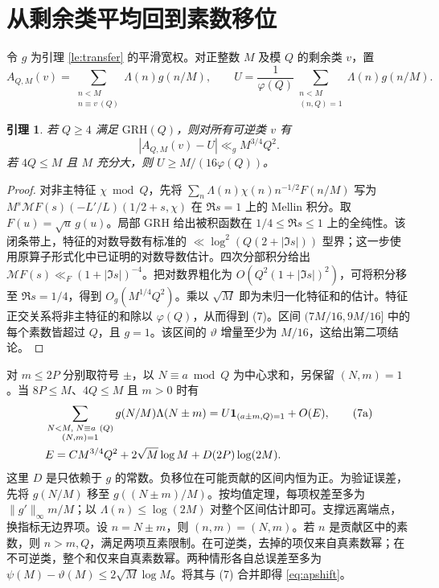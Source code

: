 \documentclass[UTF8,a4paper,11pt,fontset=fandol]{ctexart}
\newtheorem{lemma}[theorem]{引理}
\newcommand{\Lam}{\Lambda}
\newcommand{\ind}{\mathbf 1}
\newcommand{\GRH}{\mathrm{GRH}}
\begin{document}
\section{从剩余类平均回到素数移位}
令 \(g\) 为引理 \ref{le:transfer} 的平滑宽权。对正整数 \(M\) 及模 \(Q\) 的剩余类 \(v\)，置
\[
 A_{Q,M}(v)=\sum_{\substack{n<M\\n\equiv v\ (Q)}}\Lam(n)g(n/M),
 \qquad U=\frac{1}{\varphi(Q)}
       \sum_{\substack{n<M\\(n,Q)=1}}\Lam(n)g(n/M).
\]
\begin{lemma}\label{le:ap}
若 \(Q\ge4\) 满足 \(\GRH(Q)\)，则对所有可逆类 \(v\) 有
\[
                  |A_{Q,M}(v)-U|\ll_g M^{3/4}Q^2.            \tag{7}
\]
若 \(4Q\le M\) 且 \(M\) 充分大，则 \(U\ge M/(16\varphi(Q))\)。
\end{lemma}
\begin{proof}
对非主特征 \(\chi\bmod Q\)，先将
\(\sum_n\Lam(n)\chi(n)n^{-1/2}F(n/M)\) 写为
\(M^s\mathcal MF(s)(-L'/L)(1/2+s,\chi)\) 在 \(\Re s=1\) 上的 Mellin 积分。取 \(F(u)=\sqrt{u}\,g(u)\)。局部 GRH 给出被积函数在 \(1/4\le\Re s\le1\) 上的全纯性。该闭条带上，特征的对数导数有标准的 \(\ll\log^2(Q(2+|\Im s|))\) 型界；这一步使用原算子形式化中已证明的对数导数估计。四次分部积分给出 \(\mathcal MF(s)\ll_F(1+|\Im s|)^{-4}\)。把对数界粗化为 \(O(Q^2(1+|\Im s|)^2)\)，可将积分移至 \(\Re s=1/4\)，得到 \(O_g(M^{1/4}Q^2)\)。乘以 \(\sqrt M\) 即为未归一化特征和的估计。特征正交关系将非主特征的和除以 \(\varphi(Q)\)，从而得到 (7)。区间 \((7M/16,9M/16]\) 中的每个素数皆超过 \(Q\)，且 \(g=1\)。该区间的 \(\vartheta\) 增量至少为 \(M/16\)，这给出第二项结论。
\end{proof}

对 \(m\le2P\) 分别取符号 \(\pm\)，以 \(N\equiv a\bmod Q\) 为中心求和，另保留 \((N,m)=1\)。当 \(8P\le M\)、\(4Q\le M\) 且 \(m>0\) 时有
\begin{align}
 &\sum_{\substack{N<M,\;N\equiv a\ (Q)\\(N,m)=1}}
            g(N/M)\Lam(N\pm m)
       = U\ind_{(a\pm m,Q)=1}+O(E),                          \tag{7a}\label{eq:apshift}\\
 &E=C M^{3/4}Q^2+2\sqrt M\log M+D(2P)\log(2M). \notag
\end{align}
这里 \(D\) 是只依赖于 \(g\) 的常数。负移位在可能贡献的区间内恒为正。为验证误差，先将 \(g(N/M)\) 移至 \(g((N\pm m)/M)\)。按均值定理，每项权差至多为 \(\|g'\|_\infty m/M\)；以 \(\Lam(n)\le\log(2M)\) 对整个区间估计即可。支撑远离端点，换指标无边界项。设 \(n=N\pm m\)，则 \((n,m)=(N,m)\)。若 \(n\) 是贡献区中的素数，则 \(n>m,Q\)，满足两项互素限制。在可逆类，去掉的项仅来自真素数幂；在不可逆类，整个和仅来自真素数幂。两种情形各自总误差至多为 \(\psi(M)-\vartheta(M)\le2\sqrt M\log M\)。将其与 (7) 合并即得 \eqref{eq:apshift}。
\end{document}
